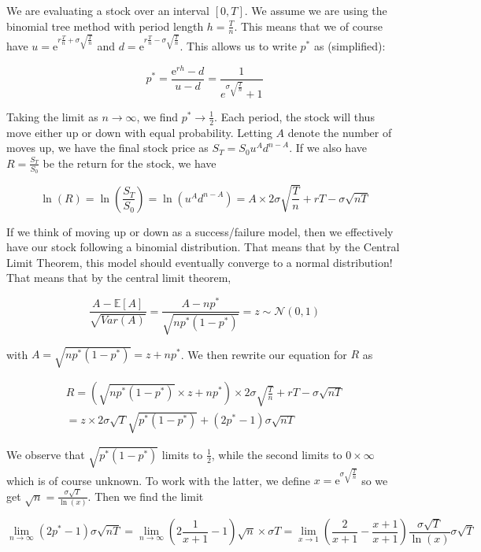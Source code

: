 \documentclass[12pt, letterpaper]{article}
\newcommand{\e}{\mathrm{e}}
\newcommand{\Ex}[1]{\mathbb{E}\left[#1\right]}
\begin{document}
    We are evaluating a stock over an interval \([0,T]\). We assume we are using the binomial tree method with period length \(h = \frac{T}{n}\). This means that we of course have \(u = \e^{r \frac{T}{n} + \sigma \sqrt{\frac{T}{n}}}\) and \(d = \e^{r \frac{T}{n} - \sigma \sqrt{\frac{T}{n}}}\). This allows us to write \(p^*\) as (simplified):

    \[ p^* = \frac{\e^{rh} - d}{u - d} = \frac{1}{e^{\sigma \sqrt{\frac{T}{n}}} + 1}    \]

    Taking the limit as \(n \rightarrow \infty\), we find \(p^* \rightarrow \frac{1}{2}\). Each period, the stock will thus move either up or down with equal probability. Letting \(A\) denote the number of moves up, we have the final stock price as \(S_T = S_0 u^A d^{n - A}\). If we also have \(R = \frac{S_T}{S_0}\) be the return for the stock, we have

    \[ \ln(R) = \ln(\frac{S_T}{S_0}) = \ln(u^A d^{n - A}) = A \times 2 \sigma \sqrt{\frac{T}{n}} + rT - \sigma \sqrt{nT}  \]

    If we think of moving up or down as a success/failure model, then we effectively have our stock following a binomial distribution. That means that by the Central Limit Theorem, this model should eventually converge to a normal distribution! That means that by the central limit theorem,

    \[  \frac{A - \Ex{A}}{\sqrt{Var(A)}} = \frac{A - n p^*}{\sqrt{n p^* (1 - p^*)}} = z \sim \mathcal{N}\left(0,1\right)      \]

    with \(A = \sqrt{n p^* (1 - p^*)} = z + n p^*\). We then rewrite our equation for \(R\) as 

    \begin{align*}
    R = \left(\sqrt{n p^* (1 - p^*)} \times z + n p^* \right) \times 2 \sigma \sqrt{\frac{T}{n}} + rT - \sigma \sqrt{nT} \\ = z \times 2 \sigma \sqrt{T} \sqrt{p^* (1 - p^*)} + (2 p^* - 1) \sigma \sqrt{nT}
    \end{align*}

    We observe that \(\sqrt{p^* (1 - p^*)}\) limits to \(\frac{1}{2}\), while the second limits to \(0 \times \infty\) which is of course unknown. To work with the latter, we define \(x = \e^{\sigma \sqrt{\frac{T}{n}}}\) so we get \(\sqrt{n} = \frac{\sigma \sqrt{T}}{\ln(x)}\). Then we find the limit 

    \[ \lim_{n \rightarrow \infty} (2p^* - 1) \sigma \sqrt{nT} = \lim_{n \rightarrow \infty} \left( 2 \frac{1}{x + 1} - 1 \right) \sqrt{n} \times \sigma T = \lim_{x \rightarrow 1} \left( \frac{2}{x+1} - \frac{x+1}{x+1} \right) \frac{\sigma \sqrt{T}}{\ln(x)} \sigma \sqrt{T}  \]
\end{document}
